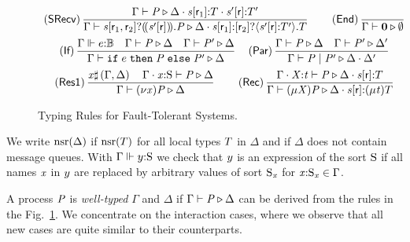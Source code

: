 \begin{figure}[tp]
\[\begin{array}{c}
		\left( \textsf{SRecv} \right) \dfrac{\Gamma \vdash \PT \triangleright \Delta \compS \Typed{\AT{\Chan}{\Role_1}}{\LT} \compS \Typed{\AT{\Chan'}{\Role}}{\LT'}}{\Gamma \vdash \PDelB{\Chan}{\Role_1}{\Role_2}{\AT{\Chan'}{\Role}}{\PT} \triangleright \Delta \compS \Typed{\AT{\Chan}{\Role_1}}{\LDelB{\Role_2}{\Chan'}{\Role}{\LT'}{\LT}}} \hspace{2em}
		\left( \textsf{End} \right) \dfrac{}{\Gamma \vdash \PEnd \triangleright \emptyset} \vspace{0.5em}\\
		\left( \textsf{If} \right) \dfrac{\Gamma \Vdash \Typed{\Expr}{\bool} \quad \Gamma \vdash \PT \triangleright \Delta \quad \Gamma \vdash \PT' \triangleright \Delta}{\Gamma \vdash \PITE{\Expr}{\PT}{\PT'} \triangleright \Delta} \hspace{1em}
		\left( \textsf{Par} \right) \dfrac{\Gamma \vdash \PT \triangleright \Delta \quad \Gamma \vdash \PT' \triangleright \Delta'}{\Gamma \vdash \PT \mid \PT' \triangleright \Delta \compS \Delta'} \vspace{0.5em}\\
		\left( \textsf{Res1} \right) \dfrac{\Args \sharp \left( \Gamma, \Delta \right) \quad \Gamma \compS \Typed{\Args}{\Sort} \vdash \PT \triangleright \Delta}{\Gamma \vdash \PRes{\Args}{\PT} \triangleright \Delta} \hspace{2em}
		\left( \textsf{Rec} \right) \dfrac{\Gamma \compS \Typed{\ProcV}{\TypeV} \vdash \PT \triangleright \Delta \compS \Typed{\AT{\Chan[s]}{\Role}}{\LT}}{\Gamma \vdash \PRep{\ProcV}{\PT} \triangleright \Delta \compS \Typed{\AT{\Chan[s]}{\Role}}{\LRep{\TypeV}{\LT}}}
	\end{array} \]
	\caption{Typing Rules for Fault-Tolerant Systems.}
	\label{fig:typingRules}
\end{figure}

We write $ \Unreliable{\Delta} $ if $ \Unreliable{\LT} $ for all local types $ \LT $ in $ \Delta $ and if $ \Delta $ does not contain message queues.
With $ \Gamma \Vdash \Typed{\Expr[y]}{\Sort} $ we check that $ \Expr[y] $ is an expression of the sort $ \Sort $ if all names $ \Args $ in $ \Expr[y] $ are replaced by arbitrary values of sort $ \Sort_{\Args} $ for $ \Typed{\Args}{\Sort_{\Args}} \in \Gamma $.

A process $ \PT $ is \emph{well-typed} \wrt $ \Gamma $ and $ \Delta $ if $ \Gamma \vdash \PT \triangleright \Delta $ can be derived from the rules in the Fig.~\ref{fig:typingRules}.
We concentrate on the interaction cases, where we observe that all new cases are quite similar to their \strongR counterparts.

